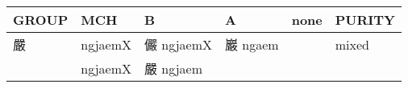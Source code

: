 \documentclass[14pt,a4paper]{scrartcl}
\begin{document}
\begin{longtable}[c]{@{}llllll@{}}
\toprule
\begin{minipage}[b]{0.14\columnwidth}\raggedright\strut
GROUP
\strut\end{minipage} &
\begin{minipage}[b]{0.14\columnwidth}\raggedright\strut
MCH
\strut\end{minipage} &
\begin{minipage}[b]{0.14\columnwidth}\raggedright\strut
B
\strut\end{minipage} &
\begin{minipage}[b]{0.14\columnwidth}\raggedright\strut
A
\strut\end{minipage} &
\begin{minipage}[b]{0.14\columnwidth}\raggedright\strut
none
\strut\end{minipage} &
\begin{minipage}[b]{0.14\columnwidth}\raggedright\strut
PURITY
\strut\end{minipage}\tabularnewline
\midrule
\endhead
\begin{minipage}[t]{0.14\columnwidth}\raggedright\strut
嚴
\strut\end{minipage} &
\begin{minipage}[t]{0.14\columnwidth}\raggedright\strut
ngjaemX
\strut\end{minipage} &
\begin{minipage}[t]{0.14\columnwidth}\raggedright\strut
儼 ngjaemX
\strut\end{minipage} &
\begin{minipage}[t]{0.14\columnwidth}\raggedright\strut
巖 ngaem
\strut\end{minipage} &
\begin{minipage}[t]{0.14\columnwidth}\raggedright\strut
\strut\end{minipage} &
\begin{minipage}[t]{0.14\columnwidth}\raggedright\strut
mixed
\strut\end{minipage}\tabularnewline
\begin{minipage}[t]{0.14\columnwidth}\raggedright\strut
𠪘
\strut\end{minipage} &
\begin{minipage}[t]{0.14\columnwidth}\raggedright\strut
ngjaemX
\strut\end{minipage} &
\begin{minipage}[t]{0.14\columnwidth}\raggedright\strut
嚴 ngjaem
\strut\end{minipage} &
\begin{minipage}[t]{0.14\columnwidth}\raggedright\strut

\end{minipage}
\end{longtable}
\end{document}
